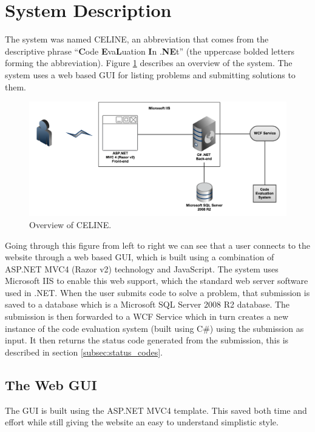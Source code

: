 \section{System Description}
The system was named CELINE, an abbreviation that comes from the descriptive phrase ``\textbf{C}ode \textbf{E}va\textbf{L}uation \textbf{I}n .\textbf{NE}t'' (the uppercase bolded letters forming the abbreviation). Figure \ref{fig:SystemOverview} describes an overview of the system. The system uses a web based GUI for listing problems and submitting solutions to them.

\begin{figure}[h]
	\centering
	\includegraphics[width=\linewidth]{chapters/media/overview.png}
	\caption{Overview of CELINE.}
	\label{fig:SystemOverview}
\end{figure}

Going through this figure from left to right we can see that a user connects to the website through a web based GUI, which is built using a combination of ASP.NET MVC4 (Razor v2) technology and JavaScript. The system uses Microsoft IIS to enable this web support, which the standard web server software used in .NET. When the user submits code to solve a problem, that submission is saved to a database which is a Microsoft SQL Server 2008 R2 database. The submission is then forwarded to a WCF Service which in turn creates a new instance of the code evaluation system (built using C\#) using the submission as input. It then returns the status code generated from the submission, this is described in section \ref{subsec:status_codes}.


\subsection{The Web GUI}
The GUI is built using the ASP.NET MVC4 template. This saved both time and effort while still giving the website an easy to understand simplistic style. 

